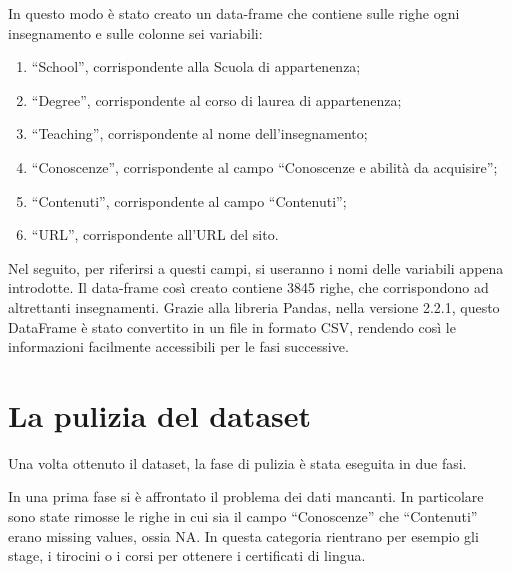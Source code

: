 \documentclass[10pt,a4paper,twoside]{tau-book}
\begin{document}
In questo modo è stato creato un data-frame che contiene sulle righe ogni insegnamento e sulle colonne sei variabili:
\begin{enumerate}
    \item “School”, corrispondente alla Scuola di appartenenza;
    \item “Degree”, corrispondente al corso di laurea di appartenenza;
    \item “Teaching”,  corrispondente al nome dell'insegnamento;
    \item “Conoscenze”, corrispondente al campo “Conoscenze e abilità da acquisire”;
    \item “Contenuti”,  corrispondente al campo “Contenuti”;
    \item “URL”, corrispondente all'URL del sito.
\end{enumerate}

Nel seguito, per riferirsi a questi campi, si useranno i nomi delle variabili appena introdotte. Il data-frame così creato contiene 3845 righe, che corrispondono ad altrettanti insegnamenti. Grazie alla libreria Pandas, nella versione 2.2.1, questo DataFrame è stato convertito in un file in formato CSV, rendendo così le informazioni facilmente accessibili per le fasi successive.

\section{La pulizia del dataset}

Una volta ottenuto il dataset, la fase di pulizia è stata eseguita in due fasi.

In una prima fase si è affrontato il problema dei dati mancanti. In particolare sono state rimosse le righe in cui sia il campo “Conoscenze” che “Contenuti” erano missing values, ossia NA. In questa categoria rientrano per esempio gli stage, i tirocini o i corsi per ottenere i certificati di lingua.
\end{document}
